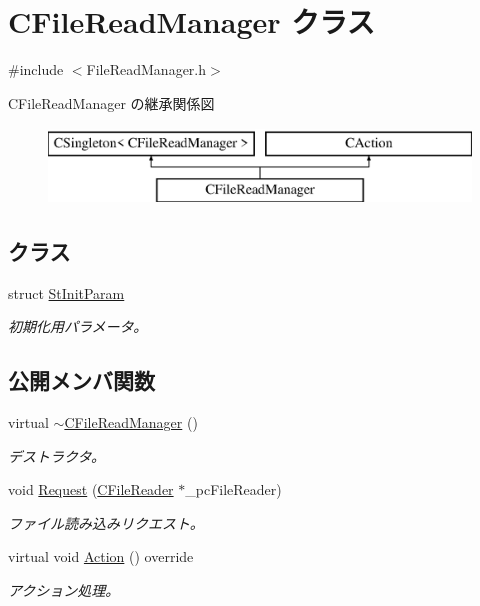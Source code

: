 \hypertarget{class_c_file_read_manager}{}\section{C\+File\+Read\+Manager クラス}
\label{class_c_file_read_manager}


{\ttfamily \#include $<$File\+Read\+Manager.\+h$>$}

C\+File\+Read\+Manager の継承関係図\begin{figure}[H]
\begin{center}
\leavevmode
\includegraphics[height=2.000000cm]{class_c_file_read_manager}
\end{center}
\end{figure}
\subsection*{クラス}
\begin{DoxyCompactItemize}
\item 
struct \hyperlink{struct_c_file_read_manager_1_1_st_init_param}{St\+Init\+Param}
\begin{DoxyCompactList}\small\item\em 初期化用パラメータ。 \end{DoxyCompactList}\end{DoxyCompactItemize}
\subsection*{公開メンバ関数}
\begin{DoxyCompactItemize}
\item 
virtual \hyperlink{class_c_file_read_manager_a1ef0e31d0e5d89fe0722f124a312438c}{$\sim$\+C\+File\+Read\+Manager} ()
\begin{DoxyCompactList}\small\item\em デストラクタ。 \end{DoxyCompactList}\item 
void \hyperlink{class_c_file_read_manager_a0bd09488d14efeed36b3445188391d34}{Request} (\hyperlink{class_c_file_reader}{C\+File\+Reader} $\ast$\+\_\+pc\+File\+Reader)
\begin{DoxyCompactList}\small\item\em ファイル読み込みリクエスト。 \end{DoxyCompactList}\item 
virtual void \hyperlink{class_c_file_read_manager_a1c0c420814fed21f257b71740c56a365}{Action} () override
\begin{DoxyCompactList}\small\item\em アクション処理。 \end{DoxyCompactList}\end{DoxyCompactItemize}
